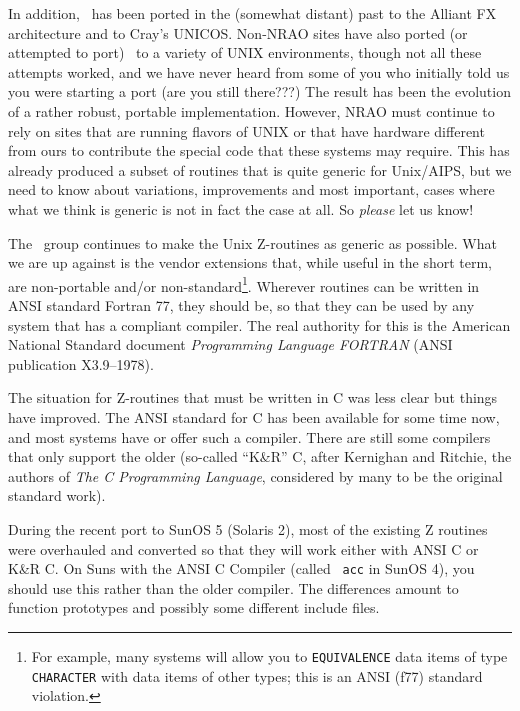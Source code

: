 In addition, \AIPS\ has been ported in the (somewhat distant) past to the
Alliant FX architecture and to Cray's UNICOS.  Non-NRAO sites have also
ported (or attempted to port) \AIPS\ to a variety of UNIX environments,
though not all these attempts worked, and we have never heard from some of
you who initially told us you were starting a port (are you still
there???)  The result has been the evolution of a rather robust, portable
implementation.  However, NRAO must continue to rely on sites that are
running flavors of UNIX or that have hardware different from ours to
contribute the special code that these systems may require.  This has
already produced a subset of routines that is quite generic for Unix/AIPS,
but we need to know about variations, improvements and most important,
cases where what we think is generic is not in fact the case at all.  So
{\it please\/} let us know! \medskip


The \AIPS\ group continues to make the Unix Z-routines as generic as
possible.  What we are up against is the vendor extensions that, while
useful in the short term, are non-portable and/or
non-standard\footnote*{\eightpoint For example,
        many systems will allow you to {\tt EQUIVALENCE} data items of
        type {\tt CHARACTER} with data items of other types; this is an
        ANSI (f77) standard violation.}.
Wherever routines can be written in ANSI standard Fortran 77, they
should be, so that they can be used by any system that has a compliant
compiler.  The real authority for this is the American National Standard
document {\it Programming Language FORTRAN\/} (ANSI publication
X3.9--1978).

The situation for Z-routines that must be written in C was less clear
but things have improved.  The ANSI standard for C has been available
for some time now, and most systems have or offer such a compiler.
There are still some compilers that only support the older (so-called
``K\&R'' C, after Kernighan and Ritchie, the authors of {\it The C
Programming Language\/}, considered by many to be the original standard
work).

During the recent port to SunOS 5 (Solaris 2), most of the existing Z
routines were overhauled and converted so that they will work either
with ANSI C or K\&R C.  On Suns with the ANSI C Compiler (called {\tt
acc} in SunOS 4), you should use this rather than the older compiler.
The differences amount to function prototypes and possibly some
different include files.
\medskip

